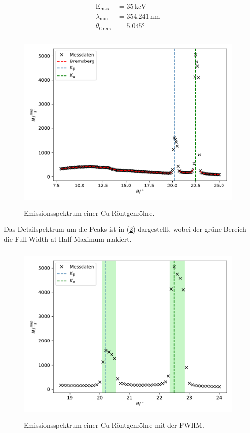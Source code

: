 \begin{align*}
    \text{E}_\text{max} &= 35 \, \mathrm{keV}\\
    \lambda_\text{min} &= 354.241 \, \mathrm{nm}\\
    \theta_\text{Grenz} &= 5.045°
\end{align*}


\begin{figure}
    \centering
       \includegraphics[height=9cm]{daten/emissionsspektrum.pdf}
       \caption{Emissionsspektrum einer Cu-Röntgenröhre.}
       \label{fig:emi}
\end{figure}

\noindent
Das Detailspektrum um die Peaks ist in (\ref{fig:emi2}) dargestellt, wobei der grüne Bereich die Full Width at Half Maximum makiert.

\begin{figure}
    \centering
       \includegraphics[height=9cm]{daten/emissionsspektrum2.pdf}
       \caption{Emissionsspektrum einer Cu-Röntgenröhre mit der FWHM.}
       \label{fig:emi2}
\end{figure}

